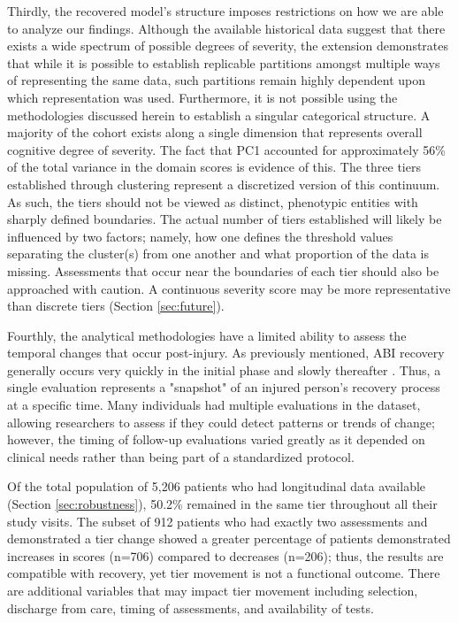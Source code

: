 Thirdly, the recovered model's structure imposes restrictions on how we are able to analyze our findings. Although the available historical data suggest that there exists a wide spectrum of possible degrees of severity, the extension demonstrates that while it is possible to establish replicable partitions amongst multiple ways of representing the same data, such partitions remain highly dependent upon which representation was used. Furthermore, it is not possible using the methodologies discussed herein to establish a singular categorical structure. A majority of the cohort exists along a single dimension that represents overall cognitive degree of severity. The fact that PC1 accounted for approximately 56\% of the total variance in the domain scores is evidence of this. The three tiers established through clustering represent a discretized version of this continuum. As such, the tiers should not be viewed as distinct, phenotypic entities with sharply defined boundaries. The actual number of tiers established will likely be influenced by two factors; namely, how one defines the threshold values separating the cluster(s) from one another and what proportion of the data is missing. Assessments that occur near the boundaries of each tier should also be approached with caution. A continuous severity score may be more representative than discrete tiers (Section \ref{sec:future}).

Fourthly, the analytical methodologies have a limited ability to assess the temporal changes that occur post-injury. As previously mentioned, ABI recovery generally occurs very quickly in the initial phase and slowly thereafter \parencite{ponsford2014longitudinal,maas2017traumatic}. Thus, a single evaluation represents a "snapshot" of an injured person's recovery process at a specific time. Many individuals had multiple evaluations in the dataset, allowing researchers to assess if they could detect patterns or trends of change; however, the timing of follow-up evaluations varied greatly as it depended on clinical needs rather than being part of a standardized protocol.

Of the total population of 5,206 patients who had longitudinal data available (Section \ref{sec:robustness}), 50.2\% remained in the same tier throughout all their study visits. The subset of 912 patients who had exactly two assessments and demonstrated a tier change showed a greater percentage of patients demonstrated increases in scores (n=706) compared to decreases (n=206); thus, the results are compatible with recovery, yet tier movement is not a functional outcome. There are additional variables that may impact tier movement including selection, discharge from care, timing of assessments, and availability of tests.

